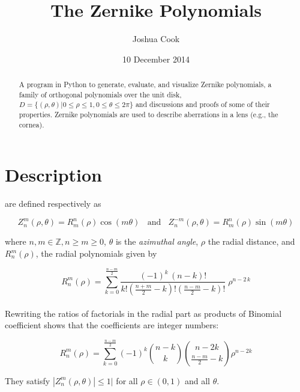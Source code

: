 \documentclass{tufte-handout}
\title{The Zernike Polynomials}
\author{Joshua Cook}
\date{10 December 2014}  %
\begin{document}
\maketitle%

\begin{abstract}
\noindent A program in Python to generate, evaluate, and visualize Zernike
polynomials, a family of orthogonal polynomials over the unit disk, $D =
\{(\rho, \theta)| 0 \leq \rho \leq 1, 0 \leq \theta \leq 2\pi\}$ and discussions and proofs
of some of their properties.  Zernike
polynomials are used to
describe aberrations in a lens (e.g., the cornea).
\end{abstract}



\section{Description}\label{sec:description}
 are defined
respectively as

\begin{equation}
Z_n^m(\rho,\theta)=R_m^n(\rho)\cos(m\theta)\ \ \ \ \text{and}\ \ \ \
Z_n^{-m}(\rho,\theta)=R_m^n(\rho)\sin(m\theta)
\end{equation}

where $n,m\in\mathbb{Z}, n\geq m\geq 0$, $\theta$ is the \textit{azimuthal angle}, $\rho$ the
radial distance, and $R^m_n(\rho)$, the radial polynomials given by

\begin{equation}
R^m_n(\rho) = \sum_{k=0}^{\tfrac{n-m}{2}} \frac{(-1)^k\,(n-k)!}{k!\left
(\tfrac{n+m}{2}-k \right )! \left (\tfrac{n-m}{2}-k \right)!} \;\rho^{n-2\,k}
\end{equation}

\paragraph{} Rewriting the ratios of factorials in the radial part as products of Binomial
coefficient shows that the coefficients are integer numbers:

\begin{equation}
\label{binomial_relation}
R_n^m(\rho)=\sum_{k=0}^{\tfrac{n-m}{2}}(-1)^k \binom{n-k}{k}
\binom{n-2k}{\tfrac{n-m}{2}-k} \rho^{n-2k}
\end{equation}

They satisfy $|Z_n^m(\rho,\theta)|\leq 1|$ for all $\rho\in(0,1)$ and all
$\theta$.
\end{document}
